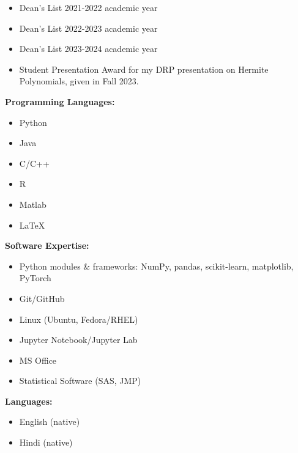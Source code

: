 \documentclass{article}
\begin{document}
		\begin{itemize}[noitemsep]
				\item Dean's List 2021-2022 academic year 
				\item Dean's List 2022-2023 academic year 
				\item Dean's List 2023-2024 academic year 
				\item Student Presentation Award for my DRP presentation on Hermite Polynomials, given in Fall 2023.
		\end{itemize}
		\vspace{1.0em}
		
		\noindent \textbf{Programming Languages:}
		\vspace{-0.8em}
		\begin{multicols}{2}
				\begin{itemize}[noitemsep, nolistsep]
						\item Python 
						\item Java 
						\item C/C++
						\item R 
						\item Matlab 
						\item \LaTeX 
				\end{itemize}
		\end{multicols}

		\noindent \textbf{Software Expertise:}
		\begin{itemize}[nolistsep]
				\item Python modules \& frameworks: NumPy, pandas, scikit-learn, matplotlib, PyTorch
		\end{itemize}
		\vspace{-1.0em}
		\begin{multicols}{2}
				\begin{itemize}[noitemsep, nolistsep]
						\item Git/GitHub 
						\item Linux (Ubuntu, Fedora/RHEL) 
						\item Jupyter Notebook/Jupyter Lab 
						\item MS Office 
						\item Statistical Software (SAS, JMP)
				\end{itemize}
		\end{multicols}

		\noindent \textbf{Languages:}
		\begin{itemize}[noitemsep, nolistsep]
				\item English (native)
				\item Hindi (native)
		\end{itemize}
\end{document}
